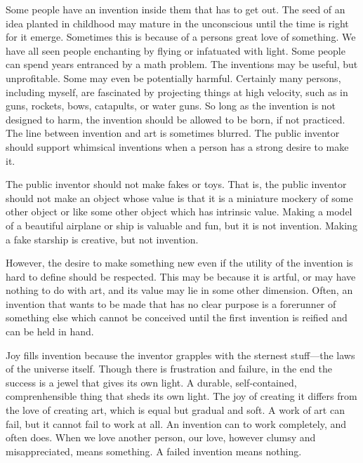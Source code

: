 \documentclass[
	fontsize=10pt, %
	twoside=false, %
	secnumdepth=1, %
]{kaobook}
\begin{document}
Some people have an invention inside them that has to get out.
The seed of an idea planted in childhood may mature in the unconscious
until the time is right for it emerge.
Sometimes this is because of a persons great love of something.
We have all seen people enchanting by flying or
infatuated with light.
Some people can spend years entranced by a math problem.
The inventions may be useful, but unprofitable.
Some may even be potentially harmful. Certainly many persons,
including myself, are fascinated by projecting things at
high velocity, such as in guns, rockets, bows,
catapults, or water guns.
So long as the invention is not designed to harm,
the invention should be allowed to be born, if not practiced.
The line between invention and art is sometimes blurred.
The public inventor should support whimsical inventions
when a person has a strong desire to make it.

The public inventor should not make fakes or toys.
That is, the public inventor should not make an object
whose value is that it is a miniature mockery of some
other object or like some other object which has intrinsic value.
Making a model of a beautiful airplane or ship is valuable
and fun, but it is not invention.
Making a fake starship is creative, but not invention.

However, the desire to make something new even if the
utility of the invention is hard to define should be
respected. This may be because it is artful, or may
have nothing to do with art, and its value may lie
in some other dimension.
Often, an invention that wants to be made that has
no clear purpose is a forerunner of something else
which cannot be conceived until the first invention
is reified and can be held in hand.

Joy fills invention because the inventor grapples with
the sternest stuff---the laws of the universe itself.
Though there is frustration and failure, in the end
the success is a jewel that gives its own light.
A durable, self-contained, comprenhensible thing that sheds
its own light.
The joy of creating it differs from the love of creating art,
which is equal but gradual and soft.
A work of art can fail, but it cannot fail to work at all.
An invention can to work completely, and
often does.
When we love another person, our love, however clumsy
and misappreciated, means something.
A failed invention means nothing.
\end{document}
